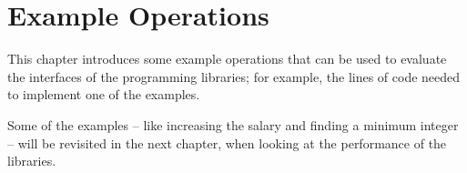 \chapter{Example Operations}
This chapter introduces some example operations that can be used to evaluate
the interfaces of the programming libraries; for example, the lines of code
needed to implement one of the examples.

Some of the examples -- like increasing the salary and finding a minimum
integer -- will be revisited in the next chapter, when looking at the
performance of the libraries.




